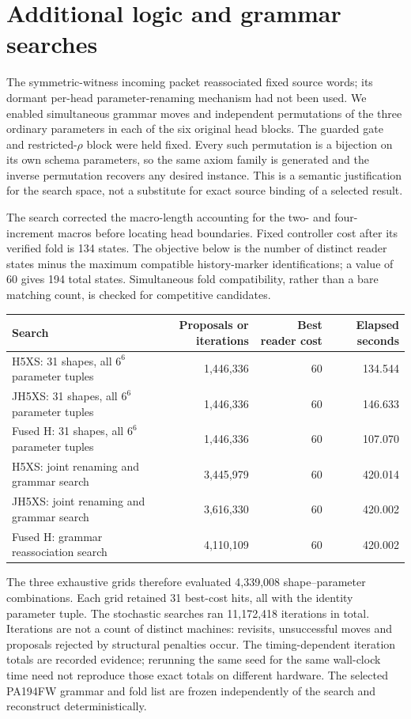 \section{Additional logic and grammar searches}
\label{sec:fw-search}

The symmetric-witness incoming packet reassociated fixed source words;
its dormant per-head parameter-renaming mechanism had not been used.
We enabled simultaneous grammar moves and independent permutations of
the three ordinary parameters in each of the six original head blocks.
The guarded gate and restricted-$\rho$ block were held fixed.  Every
such permutation is a bijection on its own schema parameters, so the
same axiom family is generated and the inverse permutation recovers any
desired instance.  This is a semantic justification for the search
space, not a substitute for exact source binding of a selected result.

The search corrected the macro-length accounting for the two- and
four-increment macros before locating head boundaries.  Fixed controller
cost after its verified fold is 134 states.  The objective below is
the number of distinct reader states minus the maximum compatible
history-marker identifications; a value of 60 gives 194 total states.
Simultaneous fold compatibility, rather than a bare matching count, is
checked for competitive candidates.

\begin{center}
\begin{tabular}{lrrr}
\toprule
Search&Proposals or iterations&Best reader cost&Elapsed seconds\\
\midrule
H5XS: 31 shapes, all $6^6$ parameter tuples&1,446,336&60&134.544\\
JH5XS: 31 shapes, all $6^6$ parameter tuples&1,446,336&60&146.633\\
Fused H: 31 shapes, all $6^6$ parameter tuples&1,446,336&60&107.070\\
H5XS: joint renaming and grammar search&3,445,979&60&420.014\\
JH5XS: joint renaming and grammar search&3,616,330&60&420.002\\
Fused H: grammar reassociation search&4,110,109&60&420.002\\
\bottomrule
\end{tabular}
\end{center}

The three exhaustive grids therefore evaluated 4,339,008
shape--parameter combinations.  Each grid retained 31 best-cost hits,
all with the identity parameter tuple.  The stochastic searches ran
11,172,418 iterations in total.  Iterations are not a count of distinct
machines: revisits, unsuccessful moves and proposals rejected by
structural penalties occur.  The timing-dependent iteration totals are
recorded evidence; rerunning the same seed for the same wall-clock time
need not reproduce those exact totals on different hardware.  The
selected PA194FW grammar and fold list are frozen independently of the
search and reconstruct deterministically.

